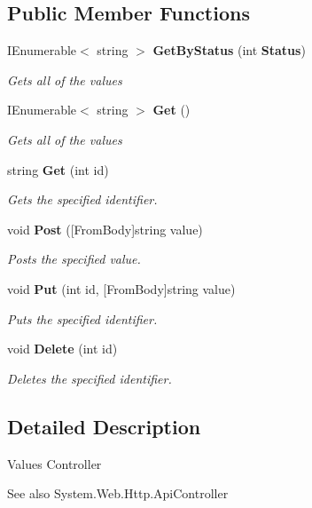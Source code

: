 \subsection*{Public Member Functions}
\begin{DoxyCompactItemize}
\item 
I\+Enumerable$<$ string $>$ \textbf{ Get\+By\+Status} (int \textbf{ Status})
\begin{DoxyCompactList}\small\item\em Gets all of the values \end{DoxyCompactList}\item 
I\+Enumerable$<$ string $>$ \textbf{ Get} ()
\begin{DoxyCompactList}\small\item\em Gets all of the values \end{DoxyCompactList}\item 
string \textbf{ Get} (int id)
\begin{DoxyCompactList}\small\item\em Gets the specified identifier. \end{DoxyCompactList}\item 
void \textbf{ Post} ([From\+Body]string value)
\begin{DoxyCompactList}\small\item\em Posts the specified value. \end{DoxyCompactList}\item 
void \textbf{ Put} (int id, [From\+Body]string value)
\begin{DoxyCompactList}\small\item\em Puts the specified identifier. \end{DoxyCompactList}\item 
void \textbf{ Delete} (int id)
\begin{DoxyCompactList}\small\item\em Deletes the specified identifier. \end{DoxyCompactList}\end{DoxyCompactItemize}


\subsection{Detailed Description}


Values Controller 

\begin{DoxySeeAlso}{See also}
System.\+Web.\+Http.\+Api\+Controller


\end{DoxySeeAlso}


